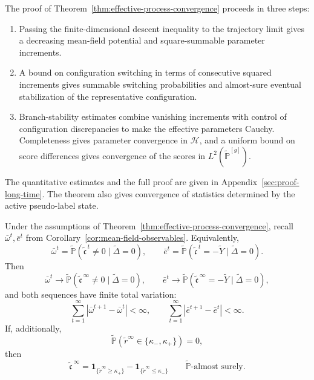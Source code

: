 The proof of Theorem~\ref{thm:effective-process-convergence}
proceeds in three steps:
\begin{enumerate}
    \item Passing the finite-dimensional descent inequality to the
    trajectory limit gives a decreasing mean-field potential and
    square-summable parameter increments.

    \item A bound on configuration switching in terms of consecutive
    squared increments gives summable switching probabilities and
    almost-sure eventual stabilization of the representative
    configuration.

    \item Branch-stability estimates combine vanishing increments
    with control of configuration discrepancies to make the effective
    parameters Cauchy. Completeness gives parameter convergence in $\mathcal{H}$,
    and a uniform bound on score differences gives convergence
    of the scores in $L^2(\tilde{\mathbb P}^{[g]})$.
\end{enumerate}
The quantitative estimates and the full proof are given in
Appendix~\ref{sec:proof-long-time}.
The theorem also gives convergence of statistics determined by the
active pseudo-label state.

\begin{corollary}
\label{cor:mean-field-selection-stabilization}
Under the assumptions of
Theorem~\ref{thm:effective-process-convergence},
recall $\bar\omega^t,\bar e^t$ from
Corollary~\ref{cor:mean-field-observables}.
Equivalently,
\[
    \bar\omega^t
    =\tilde{\mathbb P}(\tilde{\mathfrak c}^{\,t}\neq0
        \mid\tilde\Delta=0),
    \qquad
    \bar e^t
    =\tilde{\mathbb P}(\tilde{\mathfrak c}^{\,t}=-\tilde Y
        \mid\tilde\Delta=0).
\]
Then
\[
    \bar\omega^t\longrightarrow
    \tilde{\mathbb P}
        (\tilde{\mathfrak c}^{\,\infty}\neq0 \mid \tilde \Delta = 0 ),
    \qquad
    \bar e^t\longrightarrow
    \tilde{\mathbb P}
        (\tilde{\mathfrak c}^{\,\infty}=-\tilde Y \mid  \tilde \Delta = 0),
\]
and both sequences have finite total variation:
\[
    \sum_{t=1}^{\infty}
        |\bar\omega^{t+1}-\bar\omega^t|
    <\infty,
    \qquad
    \sum_{t=1}^{\infty}
        |\bar e^{t+1}-\bar e^t|
    <\infty.
\]
If, additionally,
\[
    \tilde{\mathbb P}
        (\tilde r^\infty\in\{\kappa_-,\kappa_+\})=0,
\]
then
\[
    \tilde{\mathfrak c}^{\,\infty}
    =
    \mathbf1_{\{\tilde r^\infty\geq\kappa_+\}}
    -
    \mathbf1_{\{\tilde r^\infty\leq\kappa_-\}}
    \qquad
    \tilde{\mathbb P}\text{-almost surely}.
\]
\end{corollary}
